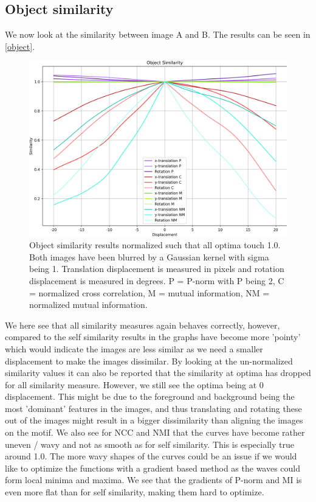 \subsection{Object similarity}
We now look at the similarity between image A and B. The results can be seen in \autoref{object}.

\begin{figure}
	\centering
	\includegraphics[width=0.8\linewidth]{Materials/objectSimilarity}
	\caption{Object similarity results normalized such that all optima touch 1.0. Both images have been blurred by a Gaussian kernel with sigma being 1. Translation displacement is measured in pixels and rotation displacement is measured in degrees. P = P-norm with P being 2, C = normalized cross correlation, M = mutual information, NM = normalized mutual information.}
	\label{object}
\end{figure}
We here see that all similarity measures again behaves correctly, however, compared to the self similarity results in  the graphs have become more 'pointy' which would indicate the images are less similar as we need a smaller displacement to make the images dissimilar. By looking at the un-normalized similarity values it can also be reported that the similarity at optima has dropped for all similarity measure. However, we still see the optima being at 0 displacement. This might be due to the foreground and background being the most 'dominant' features in the images, and thus translating and rotating these out of the images might result in a bigger dissimilarity than aligning the images on the motif. We also see for NCC and NMI that the curves have become rather uneven / wavy and not as smooth as for self similarity. This is especially true around 1.0. The more wavy shapes of the curves could be an issue if we would like to optimize the functions with a gradient based method as the waves could form local minima and maxima. We see that the gradients of P-norm and MI is even more flat than for self similarity, making them hard to optimize. 
